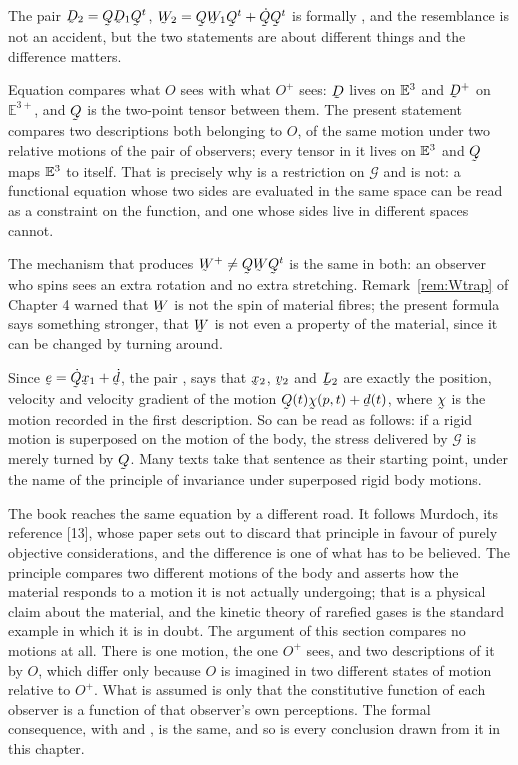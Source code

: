 \begin{remark}\label{rem:ch9mirror}
The pair $\bD_{2}=\bQ\bD_{1}\bQ^{t}$, $\bW_{2}=\bQ\bW_{1}\bQ^{t}+
\dot\bQ\bQ^{t}$ is formally , and the resemblance is not an
accident, but the two statements are about different things and the
difference matters.

Equation  compares what $O$ sees with what $O^{+}$ sees:
$\bD$ lives on $\mathbb{E}^{3}$ and $\bD^{+}$ on $\mathbb{E}^{3+}$, and $\bQ$ is
the two-point tensor between them. The present statement compares two
descriptions both belonging to $O$, of the same motion under two
relative motions of the pair of observers; every tensor in it lives on
$\mathbb{E}^{3}$ and $\bQ$ maps $\mathbb{E}^{3}$ to itself. That is precisely why 
is a restriction on $\mathcal{G}$ and  is not: a functional
equation whose two sides are evaluated in the same space can be read as
a constraint on the function, and one whose sides live in different
spaces cannot.

The mechanism that produces $\bW^{+}\neq\bQ\bW\bQ^{t}$ is the same in
both: an observer who spins sees an extra rotation and no extra
stretching. Remark~\ref{rem:Wtrap} of Chapter 4 warned that $\bW$ is not
the spin of material fibres; the present formula says something
stronger, that $\bW$ is not even a property of the material, since it
can be changed by turning around.
\end{remark}

\begin{remark}\label{rem:ch9murdoch}
Since $\be=\dot\bQ\bx_{1}+\dot\bd$, the pair , 
says that $\bx_{2}$, $\bv_{2}$ and $\bL_{2}$ are exactly the position,
velocity and velocity gradient of the motion
$\bQ(t)\bchi(p,t)+\bd(t)$, where $\bchi$ is the motion recorded in the
first description. So  can be read as follows: if a rigid
motion is superposed on the motion of the body, the stress delivered by
$\mathcal{G}$ is merely turned by $\bQ$. Many texts take that sentence
as their starting point, under the name of the principle of invariance
under superposed rigid body motions.

The book reaches the same equation by a different road. It follows
Murdoch, its reference [13], whose paper sets out to discard that
principle in favour of purely objective considerations, and the
difference is one of what has to be believed. The principle compares
two different motions of the body and asserts how the material responds
to a motion it is not actually undergoing; that is a physical claim
about the material, and the kinetic theory of rarefied gases is the
standard example in which it is in doubt. The argument of this section
compares no motions at all. There is one motion, the one $O^{+}$ sees,
and two descriptions of it by $O$, which differ only because $O$ is
imagined in two different states of motion relative to $O^{+}$. What is
assumed is only that the constitutive function of each observer is a
function of that observer's own perceptions. The formal consequence,
 with  and , is the same, and so is every
conclusion drawn from it in this chapter.
\end{remark}


